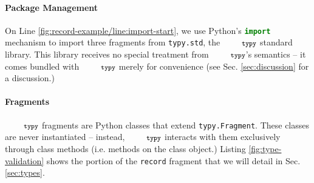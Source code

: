 \documentclass[10pt]{sigplanconf}
\newcommand{\typy}{\texttt{\footnotesize typy}}
\newcommand{\lip}[1]{\lstinline[language=Python,basicstyle=\ttfamily\footnotesize,morekeywords={with},deletendkeywords={tuple,buffer,map}]{#1}}
\newcommand{\li}[1]{\lip{#1}}
\begin{document}

\paragraph{Package Management} On Line \ref{fig:record-example/line:import-start}, we use Python's \lip{import} mechanism to import three fragments from \li{typy.std}, the $\typy$ standard library. This library receives no special treatment from $\typy$'s semantics -- it comes bundled with $\typy$ merely for convenience (see Sec. \ref{sec:discussion} for a discussion.)

\paragraph{Fragments}  $\typy$ fragments are Python classes that extend \lip{typy.Fragment}. These classes are never instantiated -- instead, $\typy$ interacts with them exclusively through class methods (i.e. methods on the class object.)  Listing \ref{fig:type-validation} shows the portion of the \lip{record} fragment that we will detail in Sec. \ref{sec:types}. 


\end{document}
